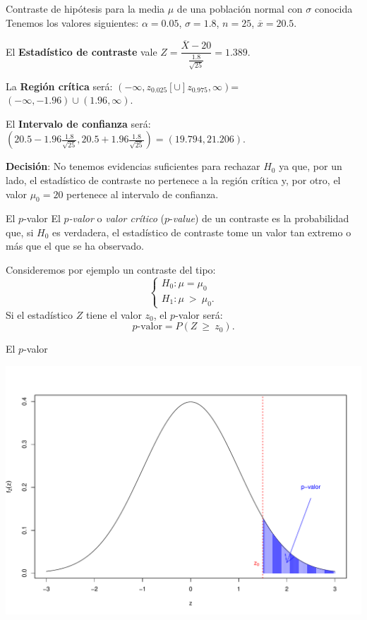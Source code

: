 \documentclass[
  ignorenonframetext,
]{beamer}
\begin{document}
\begin{frame}{Contraste de hipótesis para la media \(\mu\) de una
población normal con \(\sigma\) conocida}
\protect\hypertarget{contraste-de-hipuxf3tesis-para-la-media-mu-de-una-poblaciuxf3n-normal-con-sigma-conocida-6}{}
Tenemos los valores siguientes: \(\alpha=0.05\), \(\sigma=1.8\),
\(n=25\), \(\overline{x}=20.5\).

El \textbf{Estadístico de contraste} vale
\(Z= \dfrac{\overline{X}-20}{\frac{1.8}{\sqrt{25}}}=1.389.\)

La \textbf{Región crítica} será:
\((-\infty,z_{0.025}[\cup ]z_{0.975},\infty)\)=\((-\infty,-1.96)\cup (1.96,\infty)\).

El \textbf{Intervalo de confianza} será:
\(\left(20.5-1.96 \frac{1.8}{\sqrt{25}}, 20.5+1.96 \frac{1.8}{\sqrt{25}}\right) = (19.794,21.206)\).

\textbf{Decisión}: No tenemos evidencias suficientes para rechazar
\(H_0\) ya que, por un lado, el estadístico de contraste no pertenece a
la región crítica y, por otro, el valor \(\mu_0 =20\) pertenece al
intervalo de confianza.
\end{frame}

\begin{frame}{El \(p\)-valor}
\protect\hypertarget{el-p-valor}{}
El \emph{\(p\)-valor} o \emph{valor crítico} (\(p\)-\emph{value}) de un
contraste es la probabilidad que, si \(H_0\) es verdadera, el
estadístico de contraste tome un valor tan extremo o más que el que se
ha observado.

Consideremos por ejemplo un contraste del tipo: \[
\left\{\begin{array}{l}
H_0:\mu=\mu_0\\ H_1:\mu\ >\ \mu_0.
\end{array}
\right.
\] Si el estadístico \(Z\) tiene el valor \(z_0\), el \(p\)-valor será:
\[
\mbox{$p$-valor}=P(Z\ \geq\ z_0).
\]
\end{frame}

\begin{frame}{El \(p\)-valor}
\protect\hypertarget{el-p-valor-1}{}
\begin{center}\includegraphics{contrastes_dos_muestras_files/figure-beamer/unnamed-chunk-4-1} \end{center}
\end{frame}
\end{document}
